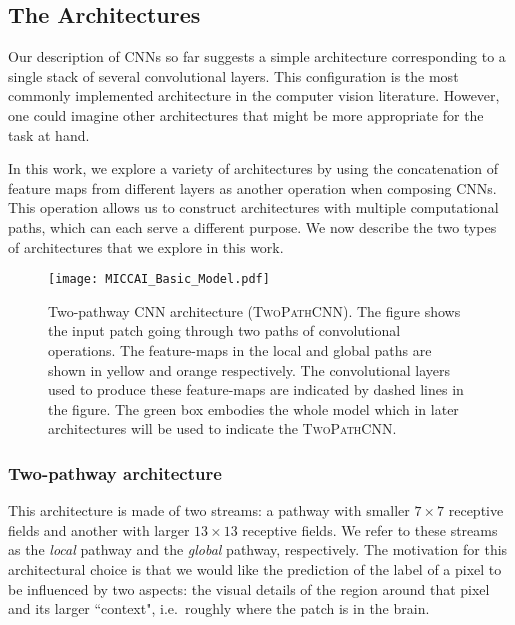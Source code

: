 \documentclass[final,5p,times,twocolumn]{elsarticle}
\begin{document}
\subsection{The Architectures}



Our description of CNNs so far suggests a simple architecture corresponding to a single stack of several convolutional layers. This configuration is the most commonly implemented architecture in the computer vision literature. However, one could imagine other architectures that might be more appropriate for the task at hand.

In this work, we explore a variety of architectures by using the concatenation of feature maps from different layers as another operation when composing CNNs. This operation allows us to construct architectures with multiple computational paths, which can each serve a different purpose.  We now describe the two types of architectures that we explore in this work.

\begin{figure*}
\centering
\texttt{[image: MICCAI\_Basic\_Model.pdf]}
\caption{Two-pathway CNN architecture (\textsc{TwoPathCNN}). The figure shows the input patch going through two paths of convolutional operations. The feature-maps in the local and global paths are shown in yellow and orange respectively. The convolutional layers used to produce these feature-maps are indicated by dashed lines in the figure. The green box embodies the whole model which in later architectures will be used to indicate the \textsc{TwoPathCNN}.}
\label{fig:basicmodel}
\end{figure*}


\subsubsection{Two-pathway architecture}
\label{sec::twoPAths}

This architecture is made of two streams: a pathway with smaller $7\times7$ receptive fields and another with larger $13\times13$ receptive fields. We refer to these streams as the {\em local} pathway and the {\em global} pathway, respectively. The motivation for this architectural choice is that we would like the prediction of the label of a pixel to be influenced by two aspects: the visual details of the region around that pixel and its larger ``context", i.e.\ roughly where the patch is in the brain. 
\end{document}
